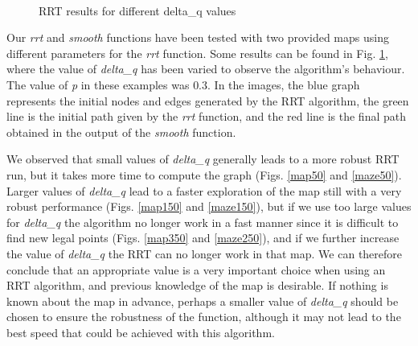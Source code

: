 \documentclass[journal]{IEEEtran}
\begin{document}
\begin{figure}[p]
	~
	\\
		
	\caption{RRT results for different delta\_q values}
	\label{fig:results}
\end{figure}


Our \textit{rrt} and \textit{smooth} functions have been tested with two provided maps using different parameters for the \textit{rrt} function. Some results can be found in Fig. \ref{fig:results}, where the value of \textit{delta\_q} has been varied to observe the algorithm's behaviour. The value of \textit{p} in these examples was $0.3$. In the images, the blue graph represents the initial nodes and edges generated by the RRT algorithm, the green line is the initial path given by the \textit{rrt} function, and the red line is the final path obtained in the output of the \textit{smooth} function.

We observed that small values of \textit{delta\_q} generally leads to a more robust RRT run, but it takes more time to compute the graph (Figs. \ref{map50} and \ref{maze50}). Larger values of \textit{delta\_q} lead to a faster exploration of the map still with a very robust performance (Figs. \ref{map150} and \ref{maze150}), but if we use too large values for \textit{delta\_q} the algorithm no longer work in a fast manner since it is difficult to find new legal points (Figs. \ref{map350} and \ref{maze250}), and if we further increase the value of \textit{delta\_q} the RRT can no longer work in that map. We can therefore conclude that an appropriate value is a very important choice when using an RRT algorithm, and previous knowledge of the map is desirable. If nothing is known about the map in advance, perhaps a smaller value of \textit{delta\_q} should be chosen to ensure the robustness of the function, although it may not lead to the best speed that could be achieved with this algorithm.
\end{document}
